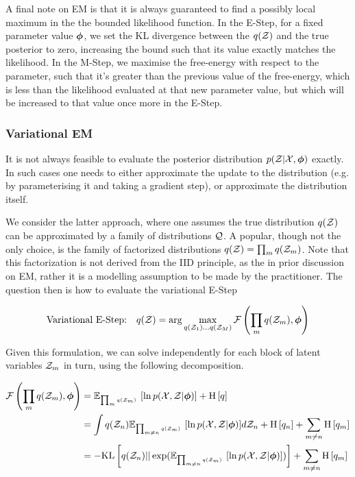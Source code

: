A final note on EM is that it is always guaranteed to find a possibly local maximum in the the bounded likelihood function. In the E-Step, for a fixed parameter value ${ \bm \phi }$, we set the KL divergence between the $q({ \mathcal{Z} })$ and the true posterior to zero, increasing the bound such that its value exactly matches the likelihood. In the M-Step, we maximise the free-energy with respect to the parameter, such that it's greater than the previous value of the free-energy, which is less than the likelihood evaluated at that new parameter value, but which will be increased to that value once more in the E-Step.


\subsubsection{Variational EM}
It is not always feasible to evaluate the posterior distribution $p({ \mathcal{Z} }|{ \mathcal{X} }, { \bm \phi })$ exactly. In such cases one needs to either approximate the update to the distribution (e.g. by parameterising it and taking a gradient step), or approximate the distribution itself.

We consider the latter approach, where one assumes the true distribution $q({ \mathcal{Z} })$ can be approximated by a family of distributions ${ \mathcal{Q} }$. A popular, though not the only choice, is the family of factorized distributions $q({ \mathcal{Z} }) = \prod_m q({ \mathcal{Z} }_m)$. Note that this factorization is not derived from the IID principle, as the in prior discussion on EM, rather it is a modelling assumption to be made by the practitioner. The question then is how to evaluate the variational E-Step

\begin{align*}
\text{Variational E-Step:} & & q({ \mathcal{Z} }) = \arg \max_{q({ \mathcal{Z} }_1) \ldots q({ \mathcal{Z} }_M)} { \mathcal{F}\left( {\prod_m q({ \mathcal{Z} }_m), { \bm \phi }} \right) }
\end{align*}

Given this formulation, we can solve independently for each block of latent variables ${ \mathcal{Z} }_m$ in turn, using the following decomposition.

\begin{align*}
{ \mathcal{F}\left( {\prod_m q( { \mathcal{Z} } _m),  {  \bm \phi  } } \right) } 
& = { \mathbb{E}_{ { {{ \mbox{\tiny ${\prod_m q({ \mathcal{Z} }_m)}$ } }} } }\left[ { \ln { p( { \mathcal{X} } ,  { \mathcal{Z} } |  {  \bm \phi  } ) } } \right] } + \text{H} \left[ q \right] \\
& = \int q({ \mathcal{Z} }_n) { \mathbb{E}_{ { {{ \mbox{\tiny ${\prod_{m\neq n} q({ \mathcal{Z} }_m)}$ } }} } }\left[ { \ln { p( { \mathcal{X} } ,  { \mathcal{Z} } |  {  \bm \phi  } ) } } \right] } d{ \mathcal{Z} }_n + \text{H} \left[ q_n \right] + \sum_{m\neq n} \text{H} \left[ q_m \right] \\
& = -\text{KL}\left[q({ \mathcal{Z} }_n)||\exp({ \mathbb{E}_{ { {{ \mbox{\tiny ${\prod_{m\neq n} q({ \mathcal{Z} }_m)}$ } }} } }\left[ { \ln { p( { \mathcal{X} } ,  { \mathcal{Z} } |  {  \bm \phi  } ) } } \right] })\right] + \sum_{m\neq n} \text{H} \left[ q_m \right]
\end{align*}

